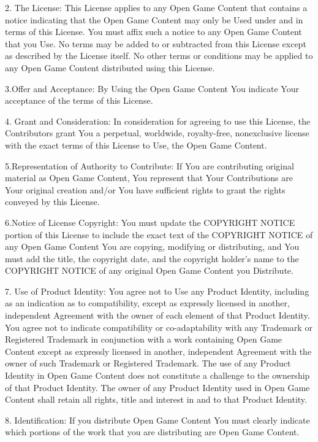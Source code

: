 2. The License: This License applies to any Open 
Game Content that contains a notice indicating that 
the Open Game Content may only be Used under and 
in terms of this License. You must affix such a notice 
to any Open Game Content that you Use. No terms 
may be added to or subtracted from this License 
except as described by the License itself. No other 
terms or conditions may be applied to any Open 
Game Content distributed using this License. 

3.Offer and Acceptance: By Using the Open Game 
Content You indicate Your acceptance of the terms of 
this License. 

4. Grant and Consideration: In consideration for 
agreeing to use this License, the Contributors grant 
You a perpetual, worldwide, royalty-free, nonexclusive
license with the exact terms of this License 
to Use, the Open Game Content. 

5.Representation of Authority to Contribute: If You 
are contributing original material as Open Game 
Content, You represent that Your Contributions are 
Your original creation and/or You have sufficient 
rights to grant the rights conveyed by this License. 

6.Notice of License Copyright: You must update the 
COPYRIGHT NOTICE portion of this License to 
include the exact text of the COPYRIGHT NOTICE of 
any Open Game Content You are copying, modifying 
or distributing, and You must add the title, the 
copyright date, and the copyright holder's name to 
the COPYRIGHT NOTICE of any original Open Game 
Content you Distribute. 

7. Use of Product Identity: You agree not to Use any 
Product Identity, including as an indication as to 
compatibility, except as expressly licensed in 
another, independent Agreement with the owner of 
each element of that Product Identity. You agree not 
to indicate compatibility or co-adaptability with any 
Trademark or Registered Trademark in conjunction 
with a work containing Open Game Content except 
as expressly licensed in another, independent 
Agreement with the owner of such Trademark or 
Registered Trademark. The use of any Product 
Identity in Open Game Content does not constitute a 
challenge to the ownership of that Product Identity. 
The owner of any Product Identity used in Open 
Game Content shall retain all rights, title and interest 
in and to that Product Identity. 

8. Identification: If you distribute Open Game 
Content You must clearly indicate which portions of 
the work that you are distributing are Open Game 
Content. 

